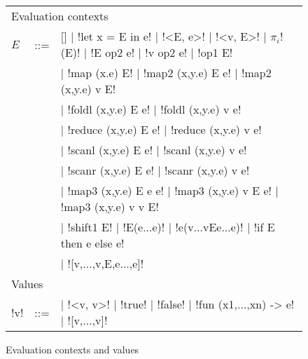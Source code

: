 \begin{figure*}[t]
    \begin{tabular}{|l c l|}
        \hline
        \multicolumn{3}{|l|}{Evaluation contexts} \\
        $E$ & \mbox{::=} & 
        [] 
        $\mid$ !let x = E in e! 
        $\mid$ !<E, e>!
        $\mid$ !<v, E>!
        $\mid$ $\pi_i$!(E)!
        $\mid$ !E op2 e!
        $\mid$ !v op2 e!
        $\mid$ !op1 E! \\
        && $\mid$ !map (x.e) E!
        $\mid$ !map2 (x,y.e) E e!
        $\mid$ !map2 (x,y.e) v E! \\
        && $\mid$ !foldl (x,y.e) E e!
        $\mid$ !foldl (x,y.e) v e! \\
        && $\mid$ !reduce (x,y.e) E e! 
        $\mid$ !reduce (x,y.e) v e! \\
        && $\mid$ !scanl (x,y.e) E e!
        $\mid$ !scanl (x,y.e) v e! \\
        && $\mid$ !scanr (x,y.e) E e!
        $\mid$ !scanr (x,y.e) v e! \\
        && $\mid$ !map3 (x,y.e) E e e!
        $\mid$ !map3 (x,y.e) v E e!
        $\mid$ !map3 (x,y.e) v v E! \\
        && $\mid$ !shift1 E!
        $\mid$ !E(e...e)!
        $\mid$ !e(v...vEe...e)!
        $\mid$ !if E then e else e! \\
        && $\mid$ ![v,...,v,E,e...,e]!
        \\ \hline
        \multicolumn{3}{|l|}{Values} \\ 
        !v! & \mbox{::=} & 
        \cnst{}  
        $\mid$ !<v, v>!
        $\mid$ !true! 
        $\mid$ !false!
        $\mid$ !fun (x1,...,xn) -> e!
        $\mid$ ![v,...,v]! 
        \\ \hline
        \end{tabular}
    \caption{Evaluation contexts and values}
\label{fig:ev_contexts}    
\end{figure*}